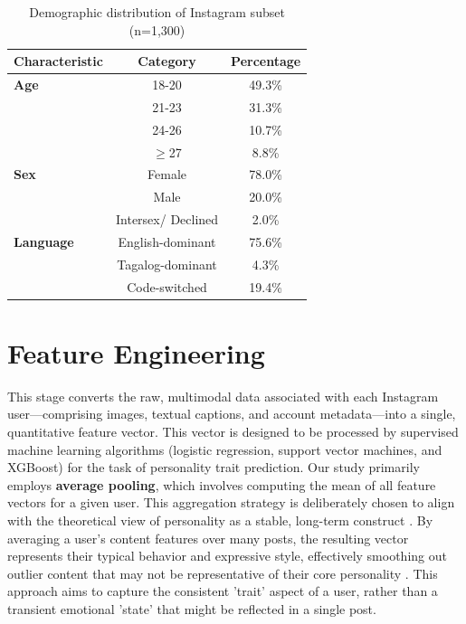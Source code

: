 \begin{table}[h]
	\centering
	\caption{Demographic distribution of Instagram subset (n=1,300)}
	\label{tab:demo}
	\begin{tabular}{lcc}
		\hline
		\textbf{Characteristic} & \textbf{Category} & \textbf{Percentage} \\ \hline
		\textbf{Age} & 18-20 & 49.3\% \\
		& 21-23 & 31.3\% \\
		& 24-26 & 10.7\% \\
		& $\geq$27 & 8.8\% \\ \hline
		\textbf{Sex} & Female & 78.0\% \\
		& Male & 20.0\% \\
		& Intersex/ Declined & 2.0\% \\ \hline
		\textbf{Language} & English-dominant & 75.6\% \\
		& Tagalog-dominant & 4.3\% \\
		& Code-switched & 19.4\% \\ \hline
	\end{tabular}
\end{table}



\section{Feature Engineering}
\label{subsec:features}
This stage converts the raw, multimodal data associated with each Instagram user—comprising images, textual captions, and account metadata—into a single, quantitative feature vector. This vector is designed to be processed by supervised machine learning algorithms (logistic regression, support vector machines, and XGBoost) for the task of personality trait prediction. Our study primarily employs \textbf{average pooling}, which involves computing the mean of all feature vectors for a given user. This aggregation strategy is deliberately chosen to align with the theoretical view of personality as a stable, long-term construct \citep{babcock2020big}. By averaging a user's content features over many posts, the resulting vector represents their typical behavior and expressive style, effectively smoothing out outlier content that may not be representative of their core personality \citep{azucar_predicting_2018}. This approach aims to capture the consistent 'trait' aspect of a user, rather than a transient emotional 'state' that might be reflected in a single post.


